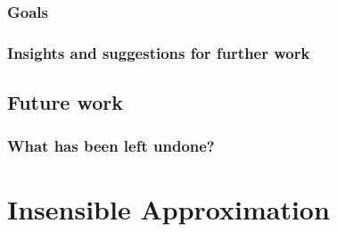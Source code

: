 \documentclass[12pt,a4paper,twoside,openright]{book}
\begin{document}
\subsection{Goals}
\label{ssec:goals}


\subsection{Insights and suggestions for further work}
\label{ssec:insights-and-suggestions}


\section{Future work}
\label{sec:future-work}


\subsection{What has been left undone?}
\label{ssec:what-has-been-left-undone}





\appendix
\chapter{Insensible Approximation}

\backmatter
\end{document}
